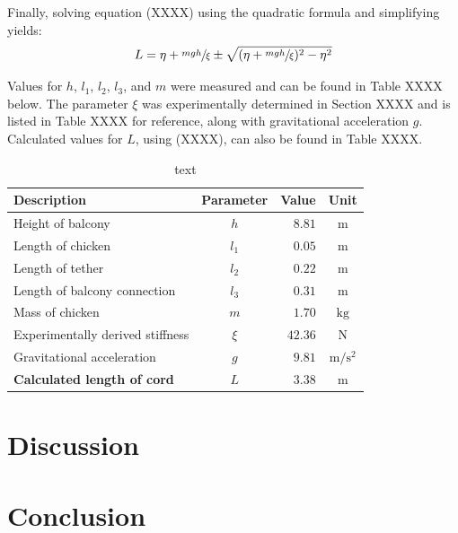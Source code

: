 \documentclass[a4paper]{article}
\begin{document}
Finally, solving equation (XXXX) using the quadratic formula and simplifying yields:
\begin{equation}
L = \eta +\sfrac{mgh}{\xi} \pm \sqrt{(\eta + \sfrac{mgh}{\xi})^2 - \eta^2}
\end{equation}

Values for $h$, $l_1$, $l_2$, $l_3$, and $m$ were measured and can be found in Table XXXX below. The parameter $\xi$ was experimentally determined in Section XXXX and is listed in Table XXXX for reference, along with gravitational acceleration $g$. Calculated values for $L$, using (XXXX), can also be found in Table XXXX.
\begin{table}[h]
	\centering
	\caption{text}
	\begin{tabular}{lcrc}
		\toprule
		 Description & Parameter & Value & Unit\\
		\midrule
		 Height of balcony & $h$ & $8.81$ & $\si{\meter}$ \\
		 Length of chicken & $l_1$ & $0.05$ & $\si{\meter}$ \\
		 Length of tether & $l_2$ & $0.22$ & $\si{\meter}$ \\
		 Length of balcony connection & $l_3$ & $0.31$ & $\si{\meter}$ \\
		 Mass of chicken & $m$ & $1.70$ & $\si{\kilogram}$ \\
		 Experimentally derived stiffness & $\xi$ & $42.36$ & $\si{\newton}$ \\
		 Gravitational acceleration & $g$ & $9.81$ & $\si{\meter\per\second^2}$ \\
		 \midrule
		 \textbf{Calculated length of cord} & $L$ & $3.38$ & $\si{\meter}$\\
		 \bottomrule
	\end{tabular}
\end{table} 

\newpage

\section{Discussion}

\section{Conclusion}



\end{document}
